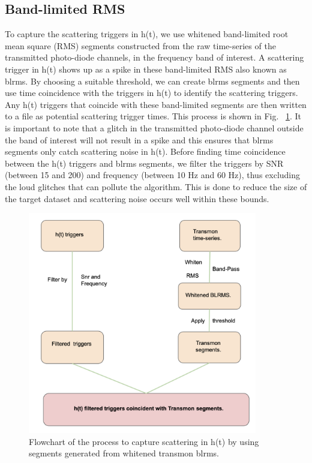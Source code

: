 \documentclass[12pt]{iopart}
\begin{document}
\subsection{Band-limited RMS}
To capture the scattering triggers in h(t), we use whitened band-limited root mean square (RMS) segments constructed from the raw time-series of the transmitted photo-diode channels, in the frequency band of interest. A scattering trigger in h(t) shows up as a spike in these band-limited RMS also known as blrms. By choosing a suitable threshold, we can create blrms segments and then use time coincidence with the triggers in h(t) to identify the scattering triggers. Any h(t) triggers that coincide with these band-limited segments are then written to a file as potential scattering trigger times.  This process is shown in Fig. ~\ref{fig:flow}. It is important to note that a glitch in the transmitted photo-diode channel outside the band of interest will not result in a spike and this ensures that blrms segments only catch scattering noise in h(t). Before finding time coincidence between the h(t) triggers and blrms segments, we filter the triggers by SNR (between 15 and 200) and frequency (between 10 Hz and 60 Hz), thus excluding the loud glitches that can pollute the algorithm. This is done to reduce the size of the target dataset and scattering noise occurs well within these bounds. 


\quad
\begin{figure}[h]
    \centering
    \includegraphics[width=10cm]{flow.png}
    \caption{Flowchart of the process to capture scattering in h(t) by using segments generated from whitened transmon blrms.}
    \label{fig:flow}
\end{figure}
\end{document}

